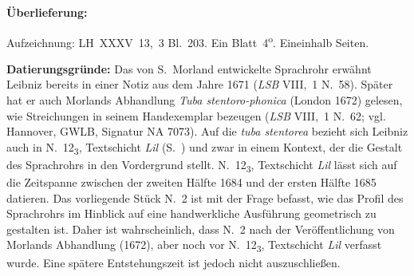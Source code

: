 %
%
%
%
\begin{ledgroupsized}[r]{120mm}
\footnotesize
%
\count{}
\count{}
\count{}
\pstart
\noindent\textbf{Überlieferung:}
\pend
\end{ledgroupsized}
\begin{ledgroupsized}[r]{114mm}
\footnotesize
\pstart \parindent -6mm
%
Aufzeichnung: LH~XXXV~13,~3 Bl.~203.
Ein Blatt~4\textsuperscript{o}.
Eineinhalb Seiten.
\pend
\end{ledgroupsized}
%
\vspace*{5mm}
\begin{ledgroup}
\footnotesize
\pstart
\noindent\textbf{Datierungsgründe:}
Das von S.~Morland\protect{} entwickelte Sprachrohr erwähnt Leibniz bereits in einer Notiz aus dem Jahre 1671 (\textit{LSB} VIII,~1 N.~58\cite{01277}).
Später hat er auch Morlands Abhandlung %
\textit{Tuba stentoro-phonica} %
(London 1672\cite{00149}) gelesen,
wie Streichungen in seinem Handexemplar bezeugen (\textit{LSB} VIII,~1 N.~62\cite{01278}; vgl. Hannover, GWLB, Signatur N\textendash A 7073).
Auf die \textit{tuba stentorea} bezieht sich Leibniz auch in N.~12\textsubscript{3}, Textschicht \textit{Lil} (S.~) %
und zwar %
in einem Kontext, der die Gestalt des Sprachrohrs in den Vordergrund stellt.
N.~12\textsubscript{3}, Textschicht \textit{Lil} %
lässt sich auf die Zeitspanne zwischen der zweiten Hälfte 1684 und der ersten Hälfte 1685 datieren.
Das vorliegende Stück N.~2 ist mit der Frage befasst, wie das Profil des Sprachrohrs im Hinblick auf eine handwerkliche Ausführung geometrisch zu gestalten ist.
Daher ist wahrscheinlich, dass N.~2 nach der Veröffentlichung von Morlands Abhandlung (1672), aber noch vor N.~12\textsubscript{3}, Textschicht \textit{Lil} %
verfasst wurde.
Eine spätere Entstehungszeit ist jedoch nicht auszuschließen.
\pend
\end{ledgroup}
